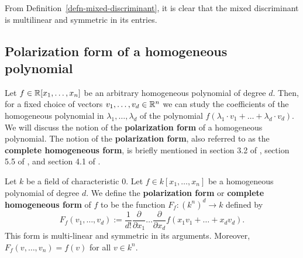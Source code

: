 \documentclass{puthesis-UG}
\begin{document}
From Definition~\ref{defn-mixed-discriminant}, it is clear that the mixed discriminant is multilinear and symmetric in its entries. 

\subsection{Polarization form of a homogeneous polynomial}

Let $f \in \mathbb{R}[x_1, \ldots, x_n]$ be an arbitrary homogeneous polynomial of degree $d$. Then, for a fixed choice of vectors $v_1, \ldots, v_d \in \mathbb{R}^n$ we can study the coefficients of the homogeneous polynomial in $\lambda_1, \ldots, \lambda_d$ of the polynomial $f(\lambda_1 \cdot v_1 + \ldots + \lambda_d \cdot v_d)$. We will discuss the notion of the \textbf{polarization form} of a homogeneous polynomial. The notion of the \textbf{polarization form}, also referred to as the \textbf{complete homogeneous form}, is briefly mentioned in section 3.2 of \cite{lie-groups}, section 5.5 of \cite{schneider_2013}, and section 4.1 of \cite{lorentzian-polynomials}. 
\begin{defn}
	Let $k$ be a field of characteristic $0$. Let $f \in k[x_1, \ldots, x_n]$ be a homogeneous polynomial of degree $d$. We define the \textbf{polarization form} or \textbf{complete homogeneous form} of $f$ to be the function $F_f : (k^n)^d \to k$ defined by 
	\[
		F_f (v_1, \ldots, v_d) := \frac{1}{d!} \frac{\partial}{\partial x_1} \ldots \frac{\partial}{\partial x_d} f(x_1 v_1 + \ldots + x_d v_d).
	\]
	This form is multi-linear and symmetric in its arguments. Moreover, $F_f(v, \ldots, v_n) = f(v)$ for all $v \in k^n$. 
\end{defn}
\end{document}
